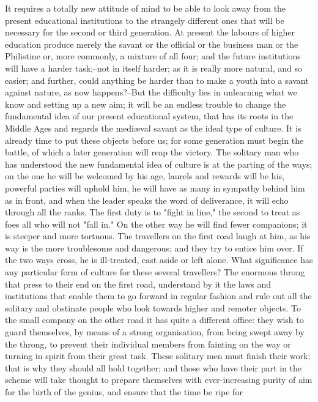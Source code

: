 It requires a totally new attitude of mind to be able to look away
from the present educational institutions to the strangely different
ones that will be necessary for the second or third generation. At
present the labours of higher education produce merely the savant or
the official or the business man or the Philistine or, more commonly,
a mixture of all four; and the future institutions will have a harder
task;--not in itself harder; as it is really more natural, and so
easier; and further, could anything be harder than to make a youth
into a savant against nature, as now happens?--But the difficulty
lies in unlearning what we know and setting up a new aim; it will be
an endless trouble to change the fundamental idea of our present
educational system, that has its roots in the Middle Ages and regards
the mediæval savant as the ideal type of culture. It is already time
to put these objects before us; for some generation must begin the
battle, of which a later generation will reap the victory. The
solitary man who has understood the new fundamental idea of culture
is at the parting of the ways; on the one he will be welcomed by his
age, laurels and rewards will be his, powerful parties will uphold
him, he will have as many in sympathy behind him as in front, and
when the leader speaks the word of deliverance, it will echo through
all the ranks. The first duty is to "fight in line," the second to
treat as foes all who will not "fall in." On the other way he will
find fewer companions; it is steeper and more tortuous. The
travellers on the first road laugh at him, as his way is the more
troublesome and dangerous; and they try to entice him over. If the
two ways cross, he is ill-treated, cast aside or left alone. What
significance has any particular form of culture for these several
travellers? The enormous throng that press to their end on the first
road, understand by it the laws and institutions that enable them to
go forward in regular fashion and rule out all the solitary and
obstinate people who look towards higher and remoter objects. To the
small company on the other road it has quite a different office: they
wish to guard themselves, by means of a strong organisation, from
being swept away by the throng, to prevent their individual members
from fainting on the way or turning in spirit from their great task.
These solitary men must finish their work; that is why they should
all hold together; and those who have their part in the scheme will
take thought to prepare themselves with ever-increasing purity of aim
for the birth of the genius, and ensure that the time be ripe for
